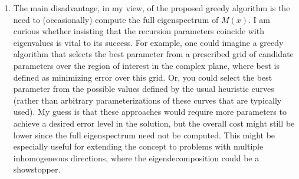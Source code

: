 \documentclass{article}
\newcommand{\response}[1]{\textcolor{red}{#1}}
\begin{document}
\begin{enumerate}
{\begin{itemize}
        \begin{itemize}
            \item Remark 2.20 becomes Remark 2.18 in the revised manuscript.
        \end{itemize}
        \item Proposition 2.25:
        \response{
        Remark 2.20 (now Remark 2.18) has been updated to refer to the discussion in Zhu \& Towne that shows that OWNS-R approximates the eigenvalues of $M$ instead of the eigenvectors.
        \begin{itemize}
            \item Proposition 2.25 becomes Proposition 2.23 in the revised manuscript.
        \end{itemize}
        }
        \item Remark 2.34: Remark 2.20 (now Remark 2.18) has been updated to refer to the discussion in Zhu \& Towne that shows that OWNS-R approximates the eigenvalues of $M$ instead of the eigenvectors. Zhu \& Towne do not show that the OWNS-R approximation to $P$ is not generally a projection, nor do they show that repeated applications of the OWNS-R approximation will cause solution blow-up.
        \begin{itemize}
            \item Proposition 2.34 becomes Proposition 2.32 in the revised manuscript.
        \end{itemize}
    \end{itemize}
    }
    
    \item The main disadvantage, in my view, of the proposed greedy algorithm is the need to (occasionally) compute the full eigenspectrum of $M(x)$. I am curious whether insisting that the recursion parameters coincide with eigenvalues is vital to its success. For example, one could imagine a greedy algorithm that selects the best parameter from a prescribed grid of candidate parameters over the region of interest in the complex plane, where best is defined as minimizing error over this grid. Or, you could select the best parameter from the possible values defined by the usual heuristic curves (rather than arbitrary parameterizations of these curves that are typically used). My guess is that these approaches would require more parameters to achieve a desired error level in the solution, but the overall cost might still be lower since the full eigenspectrum need not be computed. This might be especially useful for extending the concept to problems with multiple inhomogeneous directions, where the eigendecomposition could be a showstopper.


\end{enumerate}
\end{document}
